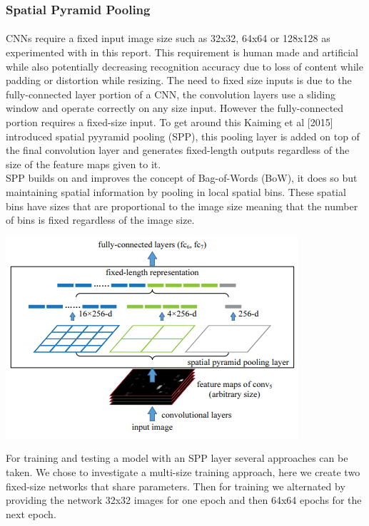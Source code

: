 \documentclass{article}
\begin{document}
\subsubsection{Spatial Pyramid Pooling}
\paragraph{}
CNNs require a fixed input image size such as 32x32, 64x64 or 128x128 as experimented with in this report. This requirement is human made and artificial while also potentially decreasing recognition accuracy due to loss of content while padding or distortion while resizing. The need to fixed size inputs is due to the fully-connected layer portion of a CNN, the convolution layers use a sliding window and operate correctly on any size input. However the fully-connected portion requires a fixed-size input. To get around this Kaiming et al [2015] introduced spatial pyyramid pooling (SPP), this pooling layer is added on top of the final convolution layer and generates fixed-length outputs regardless of the size of the feature maps given to it.  \\

SPP builds on and improves the concept of Bag-of-Words (BoW), it does so but maintaining spatial information by pooling in local spatial bins. These spatial bins have sizes that are proportional to the image size meaning that the number of bins is fixed regardless of the image size.

\begin{center}
	\includegraphics{spp}
\end{center}

For training and testing a model with an SPP layer several approaches can be taken. We chose to investigate a multi-size training approach, here we create two fixed-size networks that share parameters. Then for training we alternated by providing the network 32x32 images for one epoch and then 64x64 epochs for the next epoch. 
\end{document}
